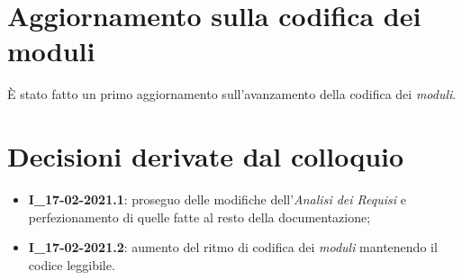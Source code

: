 \section{Aggiornamento sulla codifica dei moduli}
È stato fatto un primo aggiornamento sull'avanzamento della codifica dei \textit{moduli}.


\section{Decisioni derivate dal colloquio}
  \begin{itemize}
    \item \textbf{I\_17-02-2021.1}: proseguo delle modifiche dell'\textit{Analisi dei Requisi} e perfezionamento di quelle fatte al resto della documentazione;
    \item \textbf{I\_17-02-2021.2}: aumento del ritmo di codifica dei \textit{moduli} mantenendo il codice leggibile.
  \end{itemize}
